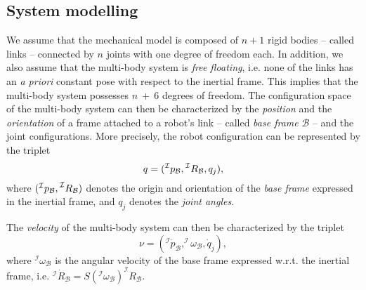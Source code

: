 \subsection{System modelling}
\label{sec:model}
We assume that the mechanical model is composed of $n+1$ rigid bodies -- called links -- connected by $n$ joints with one degree of freedom each. In addition, we also assume   that the multi-body system is \emph{free floating}, i.e. none of the links has an \emph{a priori} constant pose with respect to the inertial frame. This implies that  the multi-body system possesses $n~+~6$ degrees of freedom. The 
configuration space of the multi-body system can then be characterized by the \emph{position} and the \emph{orientation} of a frame attached to a robot's link -- called 
\emph{base frame} $\mathcal{B}$ -- and the joint configurations. 
More precisely, the robot configuration can be represented by the 
triplet 
\[q = (\prescript{\mathcal{I}}{}p_{\mathcal{B}},\prescript{\mathcal{I}}{}R_{\mathcal{B}},q_j),\] where $(\prescript{\mathcal{I}}{}p_{\mathcal{B}},\prescript{\mathcal{I}}{}R_{\mathcal{B}})$ denotes the origin  and orientation of the \emph{base frame} expressed in the inertial frame, and $q_j$ denotes the \emph{joint angles}. 

The \emph{velocity} of the multi-body system can then be characterized 
by the triplet 
\[\nu = ( ^\mathcal{I}\dot{ p}_{\mathcal{B}},^\mathcal{I}\omega_{\mathcal{B}},\dot{q}_j),\]
 where $^\mathcal{I}\omega_{\mathcal{B}}$ is the angular velocity of the base frame expressed w.r.t. the inertial frame, i.e. $^\mathcal{I}\dot{R}_{\mathcal{B}} = S(^\mathcal{I}\omega_{\mathcal{B}})^\mathcal{I}{R}_{\mathcal{B}}$. 

